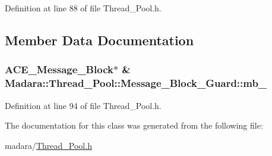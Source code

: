 Definition at line 88 of file Thread\_\-Pool.h.



\subsection{Member Data Documentation}
\hypertarget{classMadara_1_1Thread__Pool_1_1Message__Block__Guard_acbab0a814c63feb8b0b6638e289ee0e0}{
\subsubsection[{mb\_\-}]{\setlength{\rightskip}{0pt plus 5cm}ACE\_\-Message\_\-Block$\ast$ \& {\bf Madara::Thread\_\-Pool::Message\_\-Block\_\-Guard::mb\_\-}}}
\label{d5/d5e/classMadara_1_1Thread__Pool_1_1Message__Block__Guard_acbab0a814c63feb8b0b6638e289ee0e0}


Definition at line 94 of file Thread\_\-Pool.h.



The documentation for this class was generated from the following file:\begin{DoxyCompactItemize}
\item 
madara/\hyperlink{Thread__Pool_8h}{Thread\_\-Pool.h}\end{DoxyCompactItemize}
